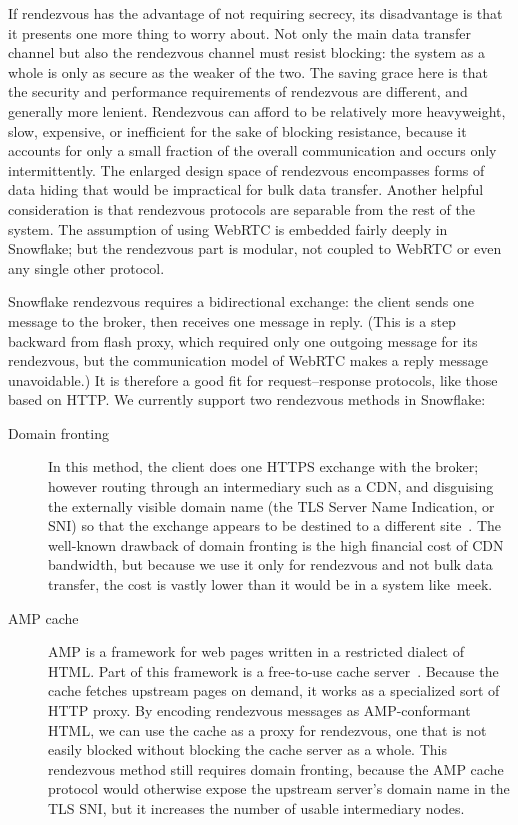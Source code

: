 \documentclass[letterpaper,twocolumn]{article}
\begin{document}
If rendezvous has the advantage of not requiring secrecy,
its disadvantage is that it presents one more thing to worry about.
Not only the main data transfer channel
but also the rendezvous channel must resist blocking:
the system as a whole is only as secure as the weaker of the two.
The saving grace here is that the security and performance requirements
of rendezvous are different, and generally more lenient.
Rendezvous can afford to be relatively more heavyweight,
slow, expensive, or inefficient for the sake of blocking resistance,
because it accounts for only a small fraction of the overall communication
and occurs only intermittently.
The enlarged design space of rendezvous encompasses
forms of data hiding that would be impractical
for bulk data transfer.
Another helpful consideration is that rendezvous protocols
are separable from the rest of the system.
The assumption of using WebRTC is embedded fairly deeply in Snowflake;
but the rendezvous part is modular,
not coupled to WebRTC or even any single other protocol.

Snowflake rendezvous requires a bidirectional exchange:
the client sends one message to the broker, then receives
one message in reply.
(This is a step backward from flash proxy,
which required only one outgoing message for its rendezvous,
but the communication model of WebRTC makes a reply message unavoidable.)
It is therefore a good fit for request--response protocols,
like those based on HTTP.
We currently support two rendezvous methods in Snowflake:

\begin{description}
\item[Domain fronting]
In this method, the client does one HTTPS exchange
with the broker; however routing through an intermediary such as a CDN,
and disguising the externally visible domain name
(the TLS Server Name Indication, or SNI) so that the exchange
appears to be destined to a different site~\cite{Fifield2015a}.
The well-known drawback of domain fronting
is the high financial cost of CDN bandwidth,
but because we use it only for rendezvous and not bulk data transfer,
the cost is vastly lower than it would be in a system like~meek.
\item[AMP cache]
AMP is a framework for web pages written in a restricted dialect of HTML.
Part of this framework is a free-to-use
cache server~\cite{amp-cache}.
Because the cache fetches upstream pages on demand,
it works as a specialized sort of HTTP proxy.
By encoding rendezvous messages as AMP-conformant HTML,
we can use the cache as a proxy for rendezvous,
one that is not easily blocked without blocking the cache server as a whole.
This rendezvous method still requires domain fronting,
because the AMP cache protocol would otherwise expose the
upstream server's domain name in the TLS SNI,
but it increases the number of usable intermediary nodes.
\end{description}
\end{document}
